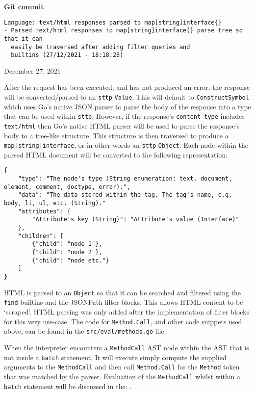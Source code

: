 \begin{center}
    \textbf{Git commit}
    \begin{verbatim}
Language: text/html responses parsed to map[string]interface{}
- Parsed text/html responses to map[string]interface{} parse tree so that it can
  easily be traversed after adding filter queries and
  builtins (27/12/2021 - 18:18:28)
    \end{verbatim}
    \vspace{-1em}
    \tiny{December 27, 2021}
\end{center}

After the request has been executed, and has not produced an error, the response will be converted/parsed to an \verb|sttp| \verb|Value|. This will default to \verb|ConstructSymbol| which uses Go's native JSON parser to parse the body of the response into a type that can be used within \verb|sttp|. However, if the response's \verb|content-type| includes \verb|text/html| then Go's native HTML parser will be used to parse the response's body to a tree-like structure. This structure is then traversed to produce a \texttt{map[string]interface{}}, or in other words an \verb|sttp| \verb|Object|. Each node within the parsed HTML document will be converted to the following representation:

\begin{verbatim}
{
    "type": "The node's type (String enumeration: text, document, element, comment, doctype, error).",
    "data": "The data stored within the tag. The tag's name, e.g. body, li, ul, etc. (String)."
    "attributes": {
        "Attribute's key (String)": "Attribute's value (Interface)"
    },
    "children": [
        {"child": "node 1"},
        {"child": "node 2"},
        {"child": "node etc."}
    ]
}
\end{verbatim}

HTML is parsed to an \verb|Object| so that it can be searched and filtered using the \verb|find| builtins and the JSONPath filter blocks. This allows HTML content to be `scraped'. HTML parsing was only added after the implementation of filter blocks for this very use-case. The code for \verb|Method.Call|, and other code snippets used above, can be found in the \verb|src/eval/methods.go| file.

When the interpreter encounters a \verb|MethodCall| AST node within the AST that is not inside a \verb|batch| statement. It will execute simply compute the supplied arguments to the \verb|MethodCall| and then call \verb|Method.Call| for the \verb|Method| token that was matched by the parser. Evaluation of the \verb|MethodCall| whilst within a \verb|batch| statement will be discussed in the: .
